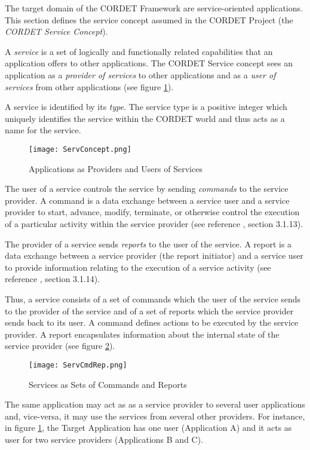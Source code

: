The target domain of the CORDET Framework are service-oriented applications. 
This section defines the service concept assumed in the CORDET Project (the \textit{CORDET Service Concept}).

A \textit{service} is a set of logically and functionally related capabilities that an application offers to other applications. 
The CORDET Service concept sees an application as a \textit{provider of services} to other applications and as a \textit{user of services} from other applications (see figure \ref{fig:ServConcept}).

A service is identified by its \textit{type}. 
The service type is a positive integer which uniquely identifies the service within the CORDET world and thus acts as a name for the service.

\begin{figure}[ht]
 \centering
 \texttt{[image: ServConcept.png]}
 \caption{Applications as Providers and Users of Services}
 \label{fig:ServConcept}
\end{figure}

The user of a service controls the service by sending \textit{commands} to the service provider. 
A command is a data exchange between a service user and a service provider to start, advance, modify, terminate, or otherwise control the execution of a particular activity within the service provider (see reference \cite{ref:pus}, section 3.1.13). 

The provider of a service sends \textit{reports} to the user of the service. 
A report is a data exchange between a service provider (the report initiator) and a service user to provide information relating to the execution of a service activity (see reference \cite{ref:pus}, section 3.1.14).

Thus, a service consists of a set of commands which the user of the service sends to the provider of the service and of a set of reports which the service provider sends back to its user. 
A command defines actions to be executed by the service provider. 
A report encapsulates information about the internal state of the service provider (see figure \ref{fig:ServCmdRep}).

\begin{figure}[ht]
 \centering
 \texttt{[image: ServCmdRep.png]}
 \caption{Services as Sets of Commands and Reports}
 \label{fig:ServCmdRep}
\end{figure}

The same application may act as as a service provider to several user applications and, vice-versa, it may use the services from several other providers. For instance, in figure \ref{fig:ServConcept}, the Target Application has one user (Application A) and it acts as user for two service providers (Applications B and C). 

